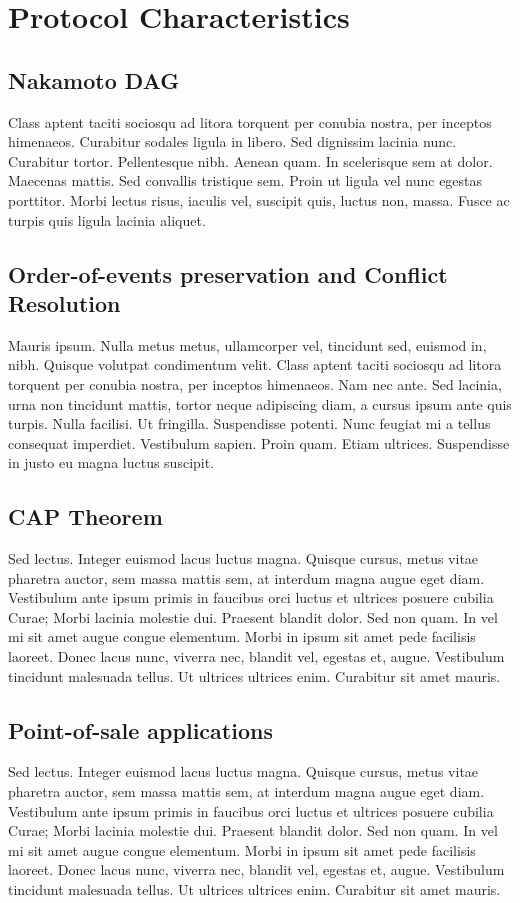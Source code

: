 \documentclass[peerreview]{ieeesyscoin}
\begin{document}
\section{Protocol Characteristics}
\label{sec:protocol}

\subsection{Nakamoto DAG}
Class aptent taciti sociosqu ad litora torquent per conubia nostra, per inceptos himenaeos. Curabitur sodales ligula in libero. Sed dignissim lacinia nunc. Curabitur tortor. Pellentesque nibh. Aenean quam. In scelerisque sem at dolor. Maecenas mattis. Sed convallis tristique sem. Proin ut ligula vel nunc egestas porttitor. Morbi lectus risus, iaculis vel, suscipit quis, luctus non, massa. Fusce ac turpis quis ligula lacinia aliquet. 

\subsection{Order-of-events preservation and Conflict Resolution}
Mauris ipsum. Nulla metus metus, ullamcorper vel, tincidunt sed, euismod in, nibh. Quisque volutpat condimentum velit. Class aptent taciti sociosqu ad litora torquent per conubia nostra, per inceptos himenaeos. Nam nec ante. Sed lacinia, urna non tincidunt mattis, tortor neque adipiscing diam, a cursus ipsum ante quis turpis. Nulla facilisi. Ut fringilla. Suspendisse potenti. Nunc feugiat mi a tellus consequat imperdiet. Vestibulum sapien. Proin quam. Etiam ultrices. Suspendisse in justo eu magna luctus suscipit. 


\subsection{CAP Theorem}
Sed lectus. Integer euismod lacus luctus magna. Quisque cursus, metus vitae pharetra auctor, sem massa mattis sem, at interdum magna augue eget diam. Vestibulum ante ipsum primis in faucibus orci luctus et ultrices posuere cubilia Curae; Morbi lacinia molestie dui. Praesent blandit dolor. Sed non quam. In vel mi sit amet augue congue elementum. Morbi in ipsum sit amet pede facilisis laoreet. Donec lacus nunc, viverra nec, blandit vel, egestas et, augue. Vestibulum tincidunt malesuada tellus. Ut ultrices ultrices enim. Curabitur sit amet mauris. 

\subsection{Point-of-sale applications}
Sed lectus. Integer euismod lacus luctus magna. Quisque cursus, metus vitae pharetra auctor, sem massa mattis sem, at interdum magna augue eget diam. Vestibulum ante ipsum primis in faucibus orci luctus et ultrices posuere cubilia Curae; Morbi lacinia molestie dui. Praesent blandit dolor. Sed non quam. In vel mi sit amet augue congue elementum. Morbi in ipsum sit amet pede facilisis laoreet. Donec lacus nunc, viverra nec, blandit vel, egestas et, augue. Vestibulum tincidunt malesuada tellus. Ut ultrices ultrices enim. Curabitur sit amet mauris. 
\end{document}

